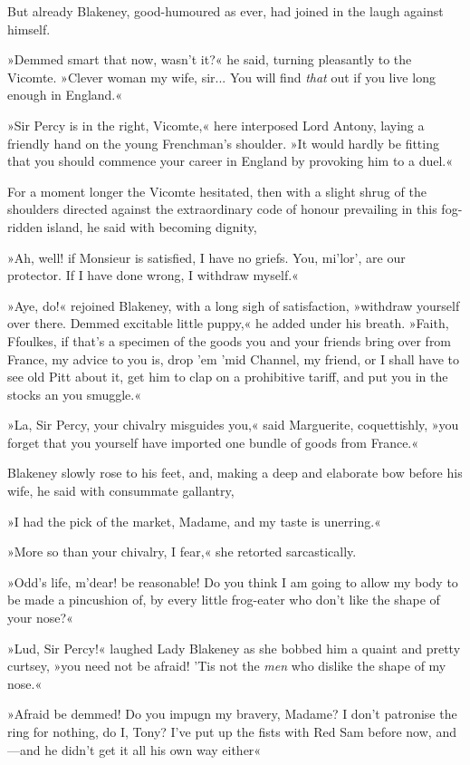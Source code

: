 But already Blakeney, good-humoured as ever, had joined in the laugh against himself.

»Demmed smart that now, wasn't it?« he said, turning pleasantly to the Vicomte. »Clever woman my wife, sir... You will find \textit{that} out if you live long enough in England.«

»Sir Percy is in the right, Vicomte,« here interposed Lord Antony, laying a friendly hand on the young Frenchman's shoulder. »It would hardly be fitting that you should commence your career in England by provoking him to a duel.«

For a moment longer the Vicomte hesitated, then with a slight shrug of the shoulders directed against the extraordinary code of honour prevailing in this fog-ridden island, he said with becoming dignity,\longdash


»Ah, well! if Monsieur is satisfied, I have no griefs. You, mi'lor', are our protector. If I have done wrong, I withdraw myself.«

»Aye, do!« rejoined Blakeney, with a long sigh of satisfaction, »withdraw yourself over there. Demmed excitable little puppy,« he added under his breath. »Faith, Ffoulkes, if that's a specimen of the goods you and your friends bring over from France, my advice to you is, drop 'em 'mid Channel, my friend, or I shall have to see old Pitt about it, get him to clap on a prohibitive tariff, and put you in the stocks an you smuggle.«

»La, Sir Percy, your chivalry misguides you,« said Marguerite, coquettishly, »you forget that you yourself have imported one bundle of goods from France.«

Blakeney slowly rose to his feet, and, making a deep and elaborate bow before his wife, he said with consummate gallantry,\longdash


»I had the pick of the market, Madame, and my taste is unerring.«

»More so than your chivalry, I fear,« she retorted sarcastically.

»Odd's life, m'dear! be reasonable! Do you think I am going to allow my body to be made a pincushion of, by every little frog-eater who don't like the shape of your nose?«

»Lud, Sir Percy!« laughed Lady Blakeney as she bobbed him a quaint and pretty curtsey, »you need not be afraid! 'Tis not the \textit{men} who dislike the shape of my nose.«

»Afraid be demmed! Do you impugn my bravery, Madame? I don't patronise the ring for nothing, do I, Tony? I've put up the fists with Red Sam before now, and\allowbreak---\allowbreak and he didn't get it all his own way either\longdash«

